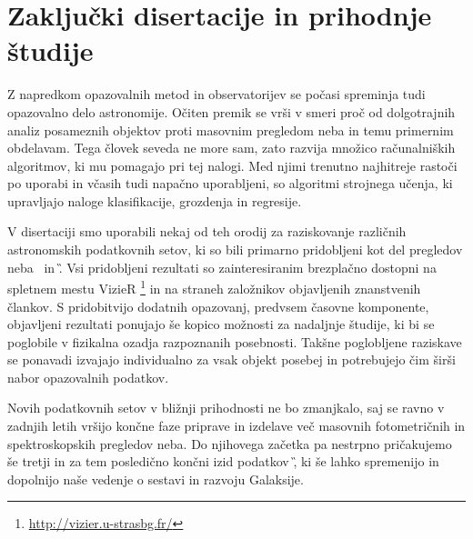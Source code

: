 \section{Zaključki disertacije in prihodnje študije}
\label{sec:slo_zakljucek}
Z napredkom opazovalnih metod in observatorijev se počasi spreminja tudi opazovalno delo astronomije. Očiten premik se vrši v smeri proč od dolgotrajnih analiz posameznih objektov proti masovnim pregledom neba in temu primernim obdelavam. Tega človek seveda ne more sam, zato razvija množico računalniških algoritmov, ki mu pomagajo pri tej nalogi. Med njimi trenutno najhitreje rastoči po uporabi in včasih tudi napačno uporabljeni, so algoritmi strojnega učenja, ki upravljajo naloge klasifikacije, grozdenja in regresije.

V disertaciji smo uporabili nekaj od teh orodij za raziskovanje različnih astronomskih podatkovnih setov, ki so bili primarno pridobljeni kot del pregledov neba \Gh\ in \G. Vsi pridobljeni rezultati so zainteresiranim brezplačno dostopni na spletnem mestu VizieR \footnote{\url{http://vizier.u-strasbg.fr/}} in na straneh založnikov objavljenih znanstvenih člankov. S pridobitvijo dodatnih opazovanj, predvsem časovne komponente, objavljeni rezultati ponujajo še kopico možnosti za nadaljnje študije, ki bi se poglobile v fizikalna ozadja razpoznanih posebnosti. Takšne poglobljene raziskave se ponavadi izvajajo individualno za vsak objekt posebej in potrebujejo čim širši nabor opazovalnih podatkov.

Novih podatkovnih setov v bližnji prihodnosti ne bo zmanjkalo, saj se ravno v zadnjih letih vršijo končne faze priprave in izdelave več masovnih fotometričnih in spektroskopskih pregledov neba. Do njihovega začetka pa nestrpno pričakujemo še tretji in za tem posledično končni izid podatkov \G, ki še lahko spremenijo in dopolnijo naše vedenje o sestavi in razvoju Galaksije.